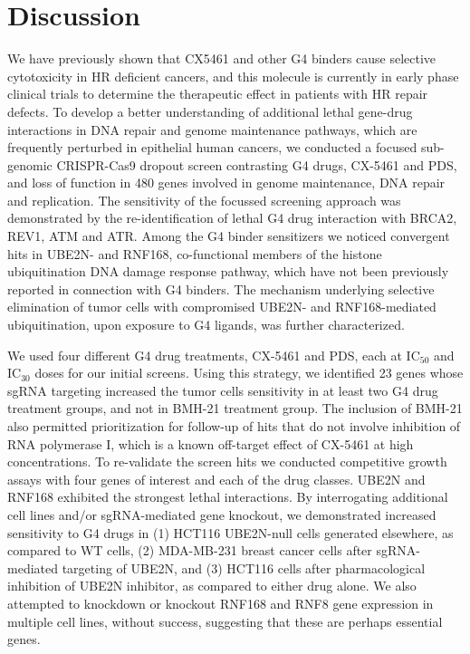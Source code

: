 \section*{Discussion}

We have previously shown that CX5461 and other G4 binders cause selective cytotoxicity in HR deficient cancers, and this molecule is currently in early phase clinical trials to determine the therapeutic effect in patients with HR repair defects. To develop a better understanding of additional lethal gene-drug interactions in DNA repair and genome maintenance pathways, which are frequently perturbed in epithelial human cancers, we conducted a focused sub-genomic CRISPR-Cas9 dropout screen contrasting G4 drugs, CX-5461 and PDS, and loss of function in 480 genes involved in genome maintenance, DNA repair and replication.
The sensitivity of the focussed screening approach was demonstrated by the re-identification of lethal G4 drug interaction with BRCA2, REV1, ATM and ATR\cite{Eddy2014,Zimmer2015,Xu2017,Negi2015a,Quin2016}.
Among the G4 binder sensitizers we noticed convergent hits in UBE2N- and RNF168, co-functional members of the histone ubiquitination DNA damage response pathway, which have not been previously reported in connection with G4 binders. The mechanism underlying selective elimination of tumor cells with compromised UBE2N- and RNF168-mediated ubiquitination, upon exposure to G4 ligands, was further characterized.

We used four different G4 drug treatments, CX-5461 and PDS, each at IC$_{50}$ and IC$_{30}$ doses for our initial screens. 
Using this strategy, we identified 23 genes whose sgRNA targeting increased the tumor cells sensitivity in at least two G4 drug treatment groups, and not in BMH-21 treatment group.  
The inclusion of BMH-21 also permitted prioritization for follow-up of hits that do not involve inhibition of RNA polymerase I, which is a known off-target effect of CX-5461 at high concentrations\cite{Xu2017}. 
To re-validate the screen hits we conducted competitive growth assays with four genes of interest and each of the drug classes. UBE2N and RNF168 exhibited the strongest lethal interactions. By interrogating additional cell lines and/or sgRNA-mediated gene knockout, we demonstrated increased sensitivity to G4 drugs in (1) HCT116 UBE2N-null cells generated elsewhere\cite{Thorslund2015}, as compared to WT cells, (2) MDA-MB-231 breast cancer cells after sgRNA-mediated targeting of UBE2N, and (3) HCT116 cells after pharmacological inhibition of UBE2N inhibitor, as compared to either drug alone. We also attempted to knockdown or knockout RNF168 and RNF8 gene expression in multiple cell lines, without success, suggesting that these are perhaps essential genes.  
 
